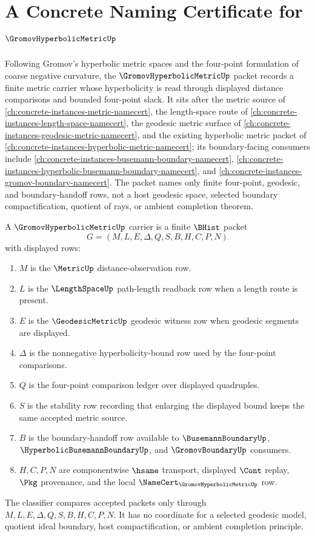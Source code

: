 \chapter{A Concrete Naming Certificate for $\GromovHyperbolicMetricUp$}
\label{ch:concrete-instances-gromov-hyperbolic-metric-namecert}

Following Gromov's hyperbolic metric spaces and the four-point formulation of coarse negative curvature, the $\GromovHyperbolicMetricUp$ packet records a finite metric carrier whose hyperbolicity is read through displayed distance comparisons and bounded four-point slack. It sits after the metric source of \autoref{ch:concrete-instances-metric-namecert}, the length-space route of \autoref{ch:concrete-instances-length-space-namecert}, the geodesic metric surface of \autoref{ch:concrete-instances-geodesic-metric-namecert}, and the existing hyperbolic metric packet of \autoref{ch:concrete-instances-hyperbolic-metric-namecert}; its boundary-facing consumers include \autoref{ch:concrete-instances-busemann-boundary-namecert}, \autoref{ch:concrete-instances-hyperbolic-busemann-boundary-namecert}, and \autoref{ch:concrete-instances-gromov-boundary-namecert}. The packet names only finite four-point, geodesic, and boundary-handoff rows, not a host geodesic space, selected boundary compactification, quotient of rays, or ambient completion theorem.

\begin{definition}
\label{def:gromov-hyperbolic-metric-carrier}
A $\GromovHyperbolicMetricUp$ carrier is a finite $\BHist$ packet
$$
G=(M,L,E,\Delta,Q,S,B,H,C,P,N)
$$
with displayed rows:
\begin{enumerate}
\item $M$ is the $\MetricUp$ distance-observation row.
\item $L$ is the $\LengthSpaceUp$ path-length readback row when a length route is present.
\item $E$ is the $\GeodesicMetricUp$ geodesic witness row when geodesic segments are displayed.
\item $\Delta$ is the nonnegative hyperbolicity-bound row used by the four-point comparisons.
\item $Q$ is the four-point comparison ledger over displayed quadruples.
\item $S$ is the stability row recording that enlarging the displayed bound keeps the same accepted metric source.
\item $B$ is the boundary-handoff row available to $\BusemannBoundaryUp$, $\HyperbolicBusemannBoundaryUp$, and $\GromovBoundaryUp$ consumers.
\item $H,C,P,N$ are componentwise $\hsame$ transport, displayed $\Cont$ replay, $\Pkg$ provenance, and the local $\NameCert_{\GromovHyperbolicMetricUp}$ row.
\end{enumerate}
The classifier compares accepted packets only through $M,L,E,\Delta,Q,S,B,H,C,P,N$. It has no coordinate for a selected geodesic model, quotient ideal boundary, host compactification, or ambient completion principle.
\end{definition}

